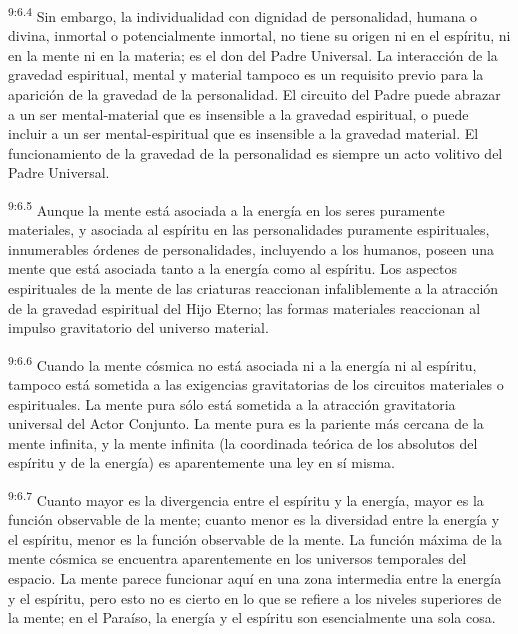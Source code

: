 \par
\textsuperscript{9:6.4} Sin embargo, la individualidad con dignidad de personalidad, humana o divina, inmortal o potencialmente inmortal, no tiene su origen ni en el espíritu, ni en la mente ni en la materia; es el don del Padre Universal. La interacción de la gravedad espiritual, mental y material tampoco es un requisito previo para la aparición de la gravedad de la personalidad. El circuito del Padre puede abrazar a un ser mental-material que es insensible a la gravedad espiritual, o puede incluir a un ser mental-espiritual que es insensible a la gravedad material. El funcionamiento de la gravedad de la personalidad es siempre un acto volitivo del Padre Universal.

\par
\textsuperscript{9:6.5} Aunque la mente está asociada a la energía en los seres puramente materiales, y asociada al espíritu en las personalidades puramente espirituales, innumerables órdenes de personalidades, incluyendo a los humanos, poseen una mente que está asociada tanto a la energía como al espíritu. Los aspectos espirituales de la mente de las criaturas reaccionan infaliblemente a la atracción de la gravedad espiritual del Hijo Eterno; las formas materiales reaccionan al impulso gravitatorio del universo material.

\par
\textsuperscript{9:6.6} Cuando la mente cósmica no está asociada ni a la energía ni al espíritu, tampoco está sometida a las exigencias gravitatorias de los circuitos materiales o espirituales. La mente pura sólo está sometida a la atracción gravitatoria universal del Actor Conjunto. La mente pura es la pariente más cercana de la mente infinita, y la mente infinita (la coordinada teórica de los absolutos del espíritu y de la energía) es aparentemente una ley en sí misma.

\par
\textsuperscript{9:6.7} Cuanto mayor es la divergencia entre el espíritu y la energía, mayor es la función observable de la mente; cuanto menor es la diversidad entre la energía y el espíritu, menor es la función observable de la mente. La función máxima de la mente cósmica se encuentra aparentemente en los universos temporales del espacio. La mente parece funcionar aquí en una zona intermedia entre la energía y el espíritu, pero esto no es cierto en lo que se refiere a los niveles superiores de la mente; en el Paraíso, la energía y el espíritu son esencialmente una sola cosa.


